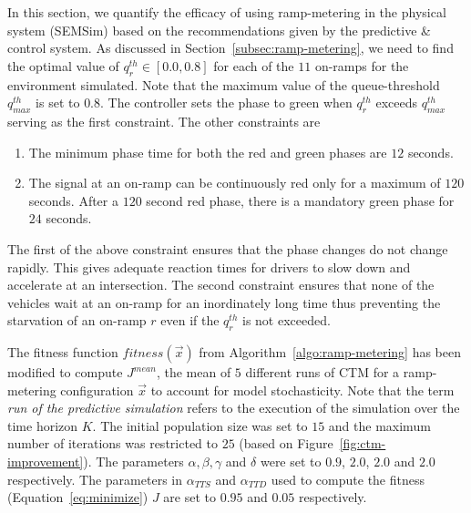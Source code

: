 \documentclass[12pt]{article}
\begin{document}
In this section, we quantify the efficacy of using ramp-metering in the physical system (SEMSim) based on the recommendations given by the predictive \& control system. As discussed in Section~\ref{subsec:ramp-metering}, we need to find the optimal value of $q^{th}_r \in [0.0,0.8]$ for each of the $11$ on-ramps for the environment simulated. Note that the maximum value of the queue-threshold $q^{th}_{max}$ is set to $0.8$. The controller sets the phase to green when $q^{th}_r$ exceeds $q^{th}_{max}$ serving as the first constraint. The other constraints are
\begin{enumerate}
\item The minimum phase time for both the red and green phases are $12$ seconds.
\item The signal at an on-ramp can be continuously red only for a maximum of $120$ seconds. After a $120$ second red phase, there is a mandatory green phase for $24$ seconds.
\end{enumerate}
The first of the above constraint ensures that the phase changes do not change rapidly. This gives adequate reaction times for drivers to slow down and accelerate at an intersection. The second constraint ensures that none of the vehicles wait at an on-ramp for an inordinately long time thus preventing the starvation of an on-ramp $r$ even if the $q^{th}_r$ is not exceeded.

The fitness function $fitness(\vec{x})$ from Algorithm~\ref{algo:ramp-metering} has been modified to compute $J^{mean}$, the mean of $5$ different runs of CTM for a ramp-metering configuration $\vec{x}$ to account for model stochasticity. Note that the term {\it run of the predictive simulation} refers to the execution of the simulation over the time horizon $K$. The initial population size was set to $15$ and the maximum number of iterations was restricted to $25$ (based on Figure~\ref{fig:ctm-improvement}). The parameters $\alpha, \beta, \gamma$ and $\delta$ were set to $0.9$, $2.0$, $2.0$ and $2.0$ respectively.  The parameters in $\alpha_{TTS}$ and $\alpha_{TTD}$ used to compute the fitness (Equation~\ref{eq:minimize}) $J$ are set to $0.95$ and $0.05$ respectively.
\end{document}
